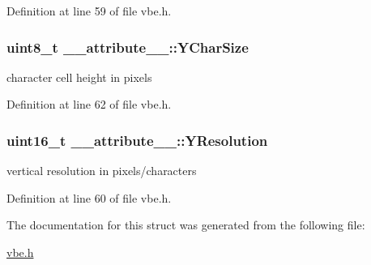 Definition at line 59 of file vbe.\+h.

\hypertarget{struct____attribute_____acb93d86860efea5c87e3c2950f39123e}{}
\subsubsection[{Y\+Char\+Size}]{\setlength{\rightskip}{0pt plus 5cm}uint8\+\_\+t \+\_\+\+\_\+attribute\+\_\+\+\_\+\+::\+Y\+Char\+Size}\label{struct____attribute_____acb93d86860efea5c87e3c2950f39123e}


character cell height in pixels 



Definition at line 62 of file vbe.\+h.

\hypertarget{struct____attribute_____aa91385451d974d9c33978062e22d39e2}{}
\subsubsection[{Y\+Resolution}]{\setlength{\rightskip}{0pt plus 5cm}uint16\+\_\+t \+\_\+\+\_\+attribute\+\_\+\+\_\+\+::\+Y\+Resolution}\label{struct____attribute_____aa91385451d974d9c33978062e22d39e2}


vertical resolution in pixels/characters 



Definition at line 60 of file vbe.\+h.



The documentation for this struct was generated from the following file\+:\begin{DoxyCompactItemize}
\item 
\hyperlink{vbe_8h}{vbe.\+h}\end{DoxyCompactItemize}
